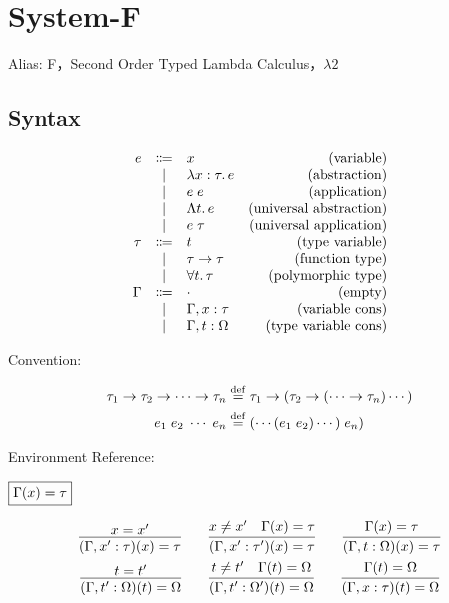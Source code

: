 \section{System-F}

Alias: F，Second Order Typed Lambda Calculus，$\lambda 2$ \cite{Girard:1989}

\subsection{Syntax}

\begin{align*}
  \begin{array}{rclr}
  e
  & \Coloneq & x &(\text{variable}) \\
  & \mid & \lambda x: \tau\ldotp e &(\text{abstraction}) \\
  & \mid & e\; e &(\text{application}) \\
  & \mid & \Lambda t\ldotp e &(\text{universal abstraction}) \\
  & \mid & e\; \tau &(\text{universal application}) \\
  \tau
  & \Coloneq & t &(\text{type variable}) \\
  & \mid & \tau \to \tau &(\text{function type}) \\
  & \mid & \forall t\ldotp \tau &(\text{polymorphic type}) \\
  \Gamma
  & \Coloneq & \cdot &(\text{empty}) \\
  & \mid & \Gamma, x: \tau &(\text{variable cons}) \\
  & \mid & \Gamma, t: \Omega &(\text{type variable cons})
  \end{array}
\end{align*}

Convention:

\begin{align*}
  \tau_1 \to \tau_2 \to \cdots \to \tau_n &\mathrel{\overset{\mathrm{def}}{=}} \tau_1 \to (\tau_2 \to (\cdots \to \tau_n) \cdots ) \\
  e_1\; e_2\; \cdots \; e_n &\mathrel{\overset{\mathrm{def}}{=}} (\cdots(e_1\; e_2)\cdots)\; e_n)
\end{align*}

Environment Reference:

$\fbox{$\Gamma(x) = \tau$}$

\begin{gather*}
  \infer{(\Gamma, x': \tau)(x) = \tau}{
    x = x'
  }
  \hspace{2em}
  \infer{(\Gamma, x': \tau')(x) = \tau}{
    x \neq x'
    &
    \Gamma(x) = \tau
  }
  \hspace{2em}
  \infer{(\Gamma, t: \Omega)(x) = \tau}{
    \Gamma(x) = \tau
  }
  \\
  \infer{(\Gamma, t': \Omega)(t) = \Omega}{
    t = t'
  }
  \hspace{2em}
  \infer{(\Gamma, t': \Omega')(t) = \Omega}{
    t \neq t'
    &
    \Gamma(t) = \Omega
  }
  \hspace{2em}
  \infer{(\Gamma, x: \tau)(t) = \Omega}{
    \Gamma(t) = \Omega
  }
\end{gather*}

